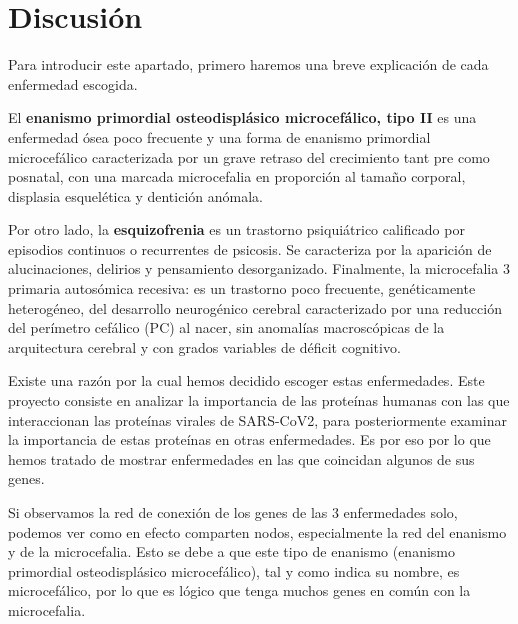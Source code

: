 \newpage
\section{Discusión}

    Para introducir este apartado, primero haremos una breve explicación de cada enfermedad escogida.

    El \textbf{enanismo primordial osteodisplásico microcefálico, tipo II} es una enfermedad ósea poco frecuente y una forma de enanismo primordial microcefálico caracterizada por un grave retraso del crecimiento tant pre como posnatal, con una marcada microcefalia en proporción al tamaño corporal, displasia esquelética y dentición anómala.
    
    Por otro lado, la \textbf{esquizofrenia} es un trastorno psiquiátrico calificado por episodios continuos o recurrentes de psicosis. Se caracteriza por la aparición de alucinaciones, delirios y pensamiento desorganizado.
    Finalmente, la microcefalia 3 primaria autosómica recesiva: es un trastorno poco frecuente, genéticamente heterogéneo, del desarrollo neurogénico cerebral caracterizado por una reducción del perímetro cefálico (PC) al nacer, sin anomalías macroscópicas de la arquitectura cerebral y con grados variables de déficit cognitivo.
    
    Existe una razón por la cual hemos decidido escoger estas enfermedades. Este proyecto consiste en analizar la importancia de las proteínas humanas con las que interaccionan las proteínas virales de SARS-CoV2, para posteriormente examinar la importancia de estas proteínas en otras enfermedades. Es por eso por lo que hemos tratado de mostrar enfermedades en las que coincidan algunos de sus genes. 
    
    Si observamos la red de conexión de los genes de las 3 enfermedades solo, podemos ver como en efecto comparten nodos, especialmente la red del enanismo y de la microcefalia. Esto se debe a que este tipo de enanismo (enanismo primordial osteodisplásico microcefálico), tal y como indica su nombre, es microcefálico, por lo que es lógico que tenga muchos genes en común con la microcefalia.

